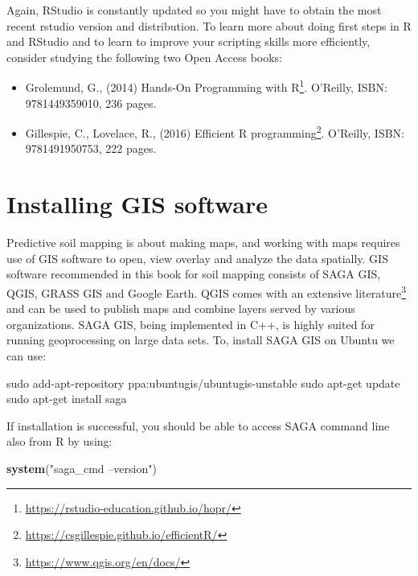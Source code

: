 \documentclass[graybox,natbib,nospthms,UStrade]{svmono}
\newenvironment{Shaded}{\begin{snugshade}}{\end{snugshade}}
\newcommand{\FunctionTok}[1]{\textcolor[rgb]{0,0,0}{#1}}
\newcommand{\KeywordTok}[1]{\textcolor[rgb]{0.27,0.27,0.27}{\textbf{#1}}}
\newcommand{\NormalTok}[1]{#1}
\newcommand{\StringTok}[1]{\textcolor[rgb]{0.5,0.5,0.5}{#1}}
\renewcommand{\href}[2]{#2 (\url{#1})}
\renewcommand{\href}[2]{#2\footnote{\url{#1}}}
\begin{document}
Again, RStudio is constantly updated so you might have to obtain the most recent rstudio version and distribution.
To learn more about doing first steps in R and RStudio and to learn to improve your scripting skills more efficiently, consider studying the following two Open Access books:

\begin{itemize}
\item
  Grolemund, G., (2014) \href{https://rstudio-education.github.io/hopr/}{Hands-On Programming with R}. O'Reilly, ISBN: 9781449359010, 236 pages.
\item
  Gillespie, C., Lovelace, R., (2016) \href{https://csgillespie.github.io/efficientR/}{Efficient R programming}. O'Reilly, ISBN: 9781491950753, 222 pages.
\end{itemize}

\hypertarget{installing-gis-software}{%
\section{Installing GIS software}\label{installing-gis-software}}

Predictive soil mapping is about making maps, and working with maps requires use of GIS software to open, view overlay and analyze the data spatially. GIS software recommended in this book for soil mapping consists of SAGA GIS, QGIS, GRASS GIS and Google Earth. QGIS comes with an \href{https://www.qgis.org/en/docs/}{extensive literature} and can be used to publish maps and combine layers served by various organizations.
SAGA GIS, being implemented in C++, is highly suited for running geoprocessing on large data sets.
To, install SAGA GIS on Ubuntu we can use:

\begin{Shaded}
\begin{Highlighting}[]
\FunctionTok{sudo}\NormalTok{ add-apt-repository ppa:ubuntugis/ubuntugis-unstable}
\FunctionTok{sudo}\NormalTok{ apt-get update}
\FunctionTok{sudo}\NormalTok{ apt-get install saga}
\end{Highlighting}
\end{Shaded}

If installation is successful, you should be able to access SAGA command line also from R by using:

\begin{Shaded}
\begin{Highlighting}[]
\KeywordTok{system}\NormalTok{(}\StringTok{"saga_cmd --version"}\NormalTok{)}
\end{Highlighting}
\end{Shaded}
\end{document}
